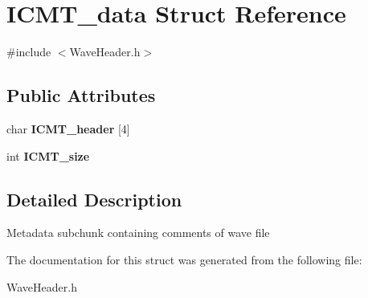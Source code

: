 \hypertarget{structICMT__data}{}\section{I\+C\+M\+T\+\_\+data Struct Reference}
\label{structICMT__data}


{\ttfamily \#include $<$Wave\+Header.\+h$>$}

\subsection*{Public Attributes}
\begin{DoxyCompactItemize}
\item 
\mbox{\label{structICMT__data_aeb693e3d890dfaeb349f8ba648038edc}} 
char {\bfseries I\+C\+M\+T\+\_\+header} \mbox{[}4\mbox{]}
\item 
\mbox{\label{structICMT__data_a809453f283626f630ba8ce4e0f48cc70}} 
int {\bfseries I\+C\+M\+T\+\_\+size}
\end{DoxyCompactItemize}


\subsection{Detailed Description}
Metadata subchunk containing comments of wave file 

The documentation for this struct was generated from the following file\+:\begin{DoxyCompactItemize}
\item 
Wave\+Header.\+h\end{DoxyCompactItemize}
